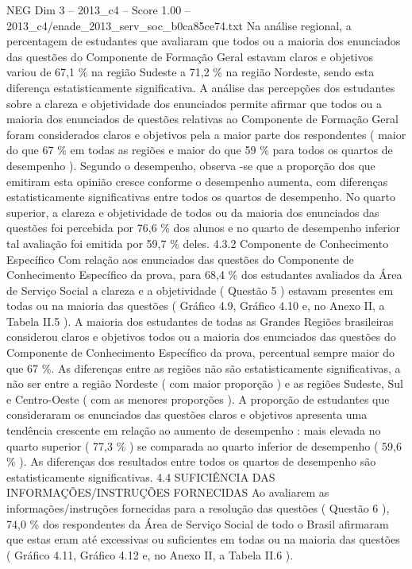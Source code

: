 \begin{textsample}{NEG Dim 3 – 2013\_c4 – Score 1.00 – 2013\_c4/enade\_2013\_serv\_soc\_b0ca85ce74.txt}
Na análise regional, a percentagem de estudantes que avaliaram que todos ou a maioria dos enunciados das questões do Componente de Formação Geral estavam claros e objetivos variou de 67,1 \% na região Sudeste a 71,2 \% na região Nordeste, sendo esta diferença estatisticamente significativa.
A análise das percepções dos estudantes sobre a clareza e objetividade dos enunciados permite afirmar que todos ou a maioria dos enunciados de questões relativas ao Componente de Formação Geral foram considerados claros e objetivos pela a maior parte dos respondentes ( maior do que 67 \% em todas as regiões e maior do que 59 \% para todos os quartos de desempenho ).
Segundo o desempenho, observa -se que a proporção dos que emitiram esta opinião cresce conforme o desempenho aumenta, com diferenças estatisticamente significativas entre todos os quartos de desempenho.
No quarto superior, a clareza e objetividade de todos ou da maioria dos enunciados das questões foi percebida por 76,6 \% dos alunos e no quarto de desempenho inferior tal avaliação foi emitida por 59,7 \% deles. 4.3.2 Componente de Conhecimento Específico Com relação aos enunciados das questões do Componente de Conhecimento Específico da prova, para 68,4 \% dos estudantes avaliados da Área de Serviço Social a clareza e a objetividade ( Questão 5 ) estavam presentes em todas ou na maioria das questões ( Gráfico 4.9, Gráfico 4.10 e, no Anexo II, a Tabela II.5 ).
A maioria dos estudantes de todas as Grandes Regiões brasileiras considerou claros e objetivos todos ou a maioria dos enunciados das questões do Componente de Conhecimento Específico da prova, percentual sempre maior do que 67 \%.
As diferenças entre as regiões não são estatisticamente significativas, a não ser entre a região Nordeste ( com maior proporção ) e as regiões Sudeste, Sul e Centro-Oeste ( com as menores proporções ).
A proporção de estudantes que consideraram os enunciados das questões claros e objetivos apresenta uma tendência crescente em relação ao aumento de desempenho : mais elevada no quarto superior ( 77,3 \% ) se comparada ao quarto inferior de desempenho ( 59,6 \% ).
As diferenças dos resultados entre todos os quartos de desempenho são estatisticamente significativas. 4.4 SUFICIÊNCIA DAS INFORMAÇÕES/INSTRUÇÕES FORNECIDAS Ao avaliarem as informações/instruções fornecidas para a resolução das questões ( Questão 6 ), 74,0 \% dos respondentes da Área de Serviço Social de todo o Brasil afirmaram que estas eram até excessivas ou suficientes em todas ou na maioria das questões ( Gráfico 4.11, Gráfico 4.12 e, no Anexo II, a Tabela II.6 ).

\end{textsample}
